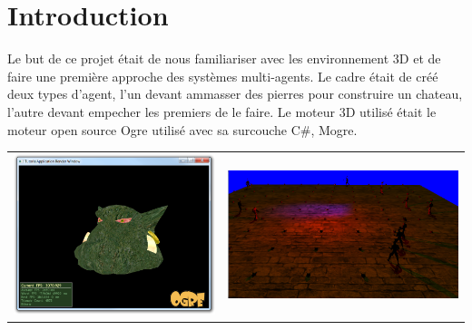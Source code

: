 \chapter{Introduction}
\thispagestyle{fancy} Le but de ce projet était de nous familiariser
avec les environnement 3D et de faire une première approche des
systèmes multi-agents. Le cadre était de créé deux types d'agent, l'un
devant ammasser des pierres pour construire un chateau, l'autre devant
empecher les premiers de le faire. Le moteur 3D utilisé était le
moteur open source Ogre utilisé avec sa surcouche C\#, Mogre.\\
\begin{center}
\begin{tabular}{c c}
\includegraphics[width=7cm]{Images/mogre_logo.png}
&
\includegraphics[width=8cm]{Images/mogre_capture.png}
\end{tabular}
\end{center}
